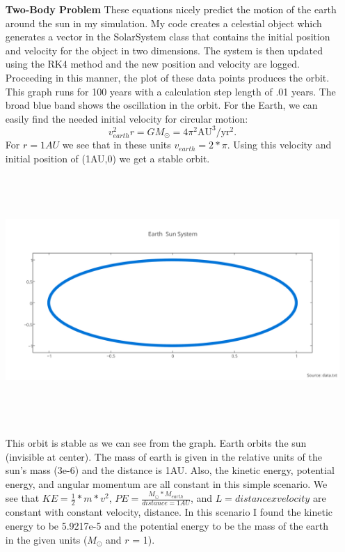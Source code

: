 \documentclass[11pt,a4wide]{article}
\begin{document}
\newpage
\begin{enumerate}
\item[\bf Two-Body Problem]
These equations nicely predict the motion of the earth around the sun in my simulation. My code creates a celestial object which generates a vector in the SolarSystem class that contains the initial position and velocity for the object in two dimensions. The system is then updated using the RK4 method and the new position and velocity are logged. Proceeding in this manner, the plot of these data points produces the orbit. This graph runs for 100 years with a calculation step length of .01 years. The broad blue band shows the oscillation in the orbit.  For the Earth, we can easily find the needed initial velocity for circular motion: 
\[
v_{earth}^2r=GM_{\odot}=4\pi^2\mathrm{AU}^3/\mathrm{yr}^2.
\]\newline
For $r=1AU$ we see that in these units $v_{earth}=2*\pi$. Using this velocity and initial position of (1AU,0) we get a stable orbit. 
\center
\includegraphics[width=5in, height=4in]{earth_sun_system.png}\\
This orbit is stable as we can see from the graph. Earth orbits the sun (invisible at center). The mass of earth is given in the relative units of the sun's mass (3e-6) and the distance is 1AU. Also, the kinetic energy, potential energy, and angular momentum are all constant in this simple scenario. We see that $KE=\frac{1}{2}*m*v^{2}$, $PE=\frac{M_{\odot}*M_{earth}}{distance=1AU}$, and $L=distance x velocity$ are constant with constant velocity, distance. In this scenario I found the kinetic energy to be 5.9217e-5 and the potential energy to be the mass of the earth in the given units ($M_{\odot}$ and $r$ = 1). 

\end{enumerate}
\end{document}
